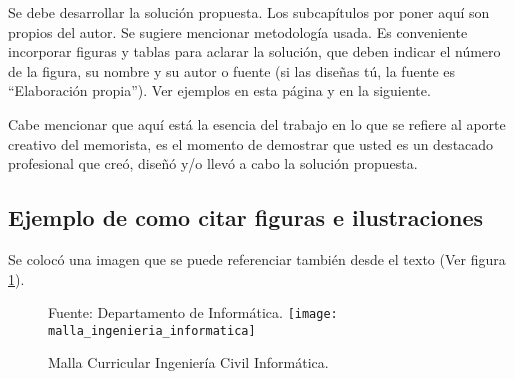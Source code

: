 
Se debe desarrollar la solución propuesta. Los subcapítulos por poner aquí son propios del autor. Se sugiere mencionar metodología usada. Es conveniente incorporar figuras y tablas para aclarar la solución, que deben indicar el número de la figura, su nombre y su autor o fuente (si las diseñas tú, la fuente es ``Elaboración propia''). Ver ejemplos en esta página y en la siguiente.

Cabe mencionar que aquí está la esencia del trabajo en lo que se refiere al aporte creativo del memorista, es el momento de demostrar que usted es un destacado profesional que creó, diseñó y/o llevó a cabo la solución propuesta.

\subsection{Ejemplo de como citar figuras e ilustraciones}

Se colocó una imagen que se puede referenciar también desde el texto (Ver figura \ref{fig:malla}).

\begin{figure}[h]
\centering
\caption{\label{fig:malla} Malla Curricular Ingeniería Civil Informática.} Fuente: Departamento de Informática.
\texttt{[image: malla\_ingenieria\_informatica]}
\end{figure}

